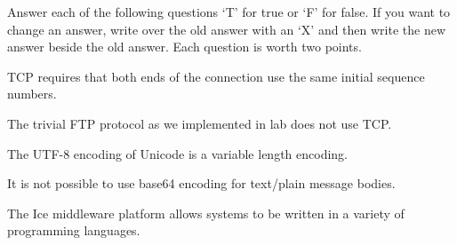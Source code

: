 \documentclass[12pt]{examdesign}
\begin{document}
\begin{truefalse}[title={True/False}]
  
Answer each of the following questions `T' for true or `F' for false. If you want to change an
answer, write over the old answer with an `X' and then write the new answer beside the old
answer. Each question is worth two points.


  \begin{question}
   TCP requires that both ends of the connection use the same initial sequence
  numbers.
  \end{question}
  

  \begin{question}
   The trivial FTP protocol as we implemented in lab does not use TCP.
  \end{question}
  

  \begin{question}
   The UTF-8 encoding of Unicode is a variable length encoding.
  \end{question}


  \begin{question}
   It is not possible to use base64 encoding for text/plain message bodies.
  \end{question}
  

  \begin{question}
   The Ice middleware platform allows systems to be written in a variety of
  programming languages.
  \end{question}

\end{truefalse}
\end{document}
